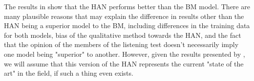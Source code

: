 The results in \cite{jeong2019virtuosonet} show that the HAN performs better than the BM model. There are many plausible reasons that may explain the difference in results other than the HAN being a superior model to the BM, including differences in the training data for both models, bias of the qualitative method towards the HAN, and the fact that the opinion of the members of the listening test doesn't necessarily imply one model being "superior" to another. However, given the results presented by \citet{jeong2019virtuosonet}, we will assume that this version of the HAN represents the current "state of the art" in the field, if such a thing even exists. 

